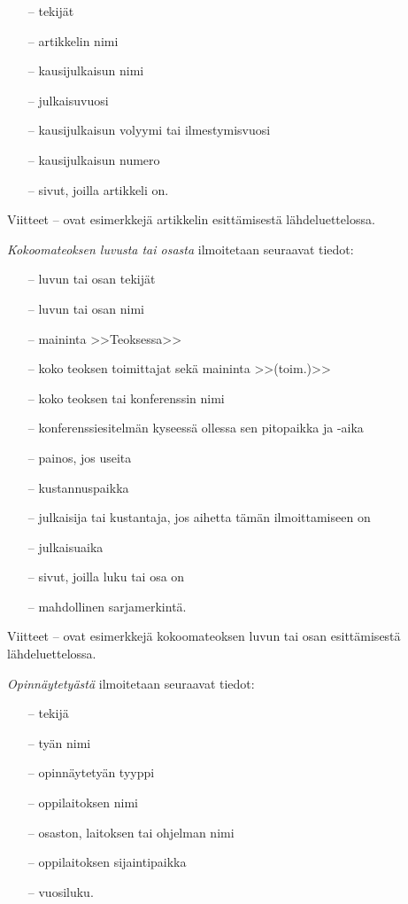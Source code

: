 \documentclass[english,12pt,a4paper,pdftex]{article}
\begin{document}
\begin{itemize}

\item[--]tekijät
\item[--]artikkelin nimi
\item[--]kausijulkaisun nimi
\item[--]julkaisuvuosi
\item[--]kausijulkaisun volyymi tai ilmestymisvuosi
\item[--]kausijulkaisun numero
\item[--]sivut, joilla artikkeli on.
\end{itemize}

Viitteet \cite{bcs}--\cite{Deschamps} ovat esimerkkejä artikkelin
esittämisestä lähdeluettelossa.

\textit{Kokoomateoksen luvusta tai osasta} ilmoitetaan seuraavat tiedot:

\begin{itemize}
\item[--]luvun tai osan tekijät
\item[--]luvun tai osan nimi
\item[--]maininta >>Teoksessa>>
\item[--]koko teoksen toimittajat sekä maininta >>(toim.)>>
\item[--]koko teoksen tai konferenssin nimi
\item[--]konferenssiesitelmän kyseessä ollessa sen pitopaikka ja -aika
\item[--]painos, jos useita
\item[--]kustannuspaikka
\item[--]julkaisija tai kustantaja, jos aihetta tämän ilmoittamiseen on
\item[--]julkaisuaika
\item[--]sivut, joilla luku tai osa on
\item[--]mahdollinen sarjamerkintä.
\end{itemize}

Viitteet \cite{Sihvola}--\cite{Lindblom} ovat esimerkkejä
kokoomateoksen luvun tai osan esittämisestä lähdeluettelossa.

\textit{Opinnäytetyästä} ilmoitetaan seuraavat tiedot:

\begin{itemize}
\item[--]tekijä
\item[--]tyän nimi
\item[--]opinnäytetyän tyyppi
\item[--]oppilaitoksen nimi
\item[--]osaston, laitoksen tai ohjelman nimi
\item[--]oppilaitoksen sijaintipaikka
\item[--]vuosiluku.
\end{itemize}
\end{document}
